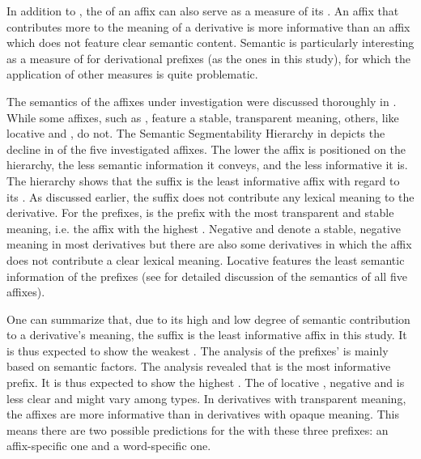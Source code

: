 {{%

In addition to , the  of an affix can also serve as a measure of its . An affix that contributes more to the meaning of a derivative is more informative than an affix which does not feature clear semantic content. Semantic  is particularly interesting as a measure of  for derivational prefixes (as the ones in this study), for which the application of other  measures is quite problematic. 

The semantics of the affixes under investigation were discussed thoroughly in . While some affixes, such as , feature a stable, transparent meaning, others, like locative  and , do not. The Semantic Segmentability Hierarchy in  depicts the decline in  of the five investigated affixes.
 The lower the affix is positioned on the hierarchy, the less semantic information it conveys, and the less informative it is. The hierarchy shows that the suffix  is the least informative affix with regard to its .  As discussed earlier, the suffix does not contribute any lexical meaning to the derivative. 
 For the prefixes,  is the prefix with the most transparent and stable meaning, i.e. the affix with the highest . Negative  and  denote a stable, negative meaning in most derivatives but there are also some derivatives in which the affix does not contribute a clear lexical meaning. Locative  features the least semantic information of the prefixes (see  for detailed discussion of the semantics of all five affixes). 

One can summarize that, due to its high  and low degree of semantic contribution to a derivative's meaning, the suffix  is the least informative affix in this study. It is thus expected to show the weakest . 
The analysis of the prefixes'  is mainly based on semantic factors. 
The analysis revealed that  is the most informative prefix. It is thus expected to show the highest . 
The  of locative , negative  and  is less clear and might vary among types. In derivatives with transparent meaning, the affixes are more informative than in derivatives with opaque meaning. This means there are two possible predictions for the  with these three prefixes: an affix-specific one and a word-specific one. 

}}

